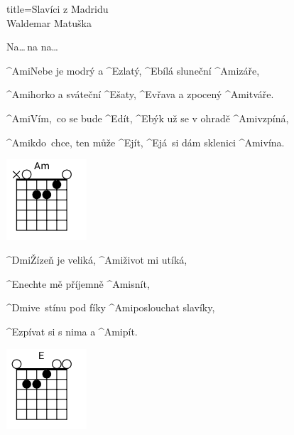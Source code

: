 \begin{song}{title=\predtitle\centering Slavíci z Madridu \\\large Waldemar Matuška \vspace*{-0.3cm}}  %
\begin{centerjustified}

	Na\elipsa\dots\,na na\elipsa\dots

\phantom{.}

\begin{minipage}{0.65\textwidth}
\sloka
	^{Ami\z}Nebe je modrý a ^{E\z}zlatý, ^{E\z}bílá sluneční ^{Ami\z}záře,\:\:

	^{Ami\z}horko a sváteční ^{E\z}šaty, ^{E\z}vřava a zpocený ^{Ami\z}tváře.

	^{Ami\z}Vím,~co se bude ^{E}dít, ^{E\z}býk už se v ohradě ^{Ami\z}vzpíná,

	^{Ami\z}kdo~chce, ten může ^{E\z}jít, ^{E\z}já~si dám sklenici ^{Ami\z}vína.
\end{minipage}
\begin{minipage}{0.1\textwidth}
\includegraphics[width=3cm]{../Akordy/am}
\end{minipage}

\phantom{.}

\begin{minipage}{0.65\textwidth}
	^{Dmi\z}Žízeň je veliká, ^{Ami\z}život mi utíká,

	^{E\z}nechte mě příjemně ^{Ami\z}snít,

	^{Dmi\z}ve~stínu pod fíky ^{Ami\z}poslouchat slavíky,

	^{E\z}zpívat si s nima a ^{Ami\z}pít.\:\:\:\:\:
\end{minipage}
\begin{minipage}{0.1\textwidth}
\includegraphics[width=3cm]{../Akordy/e}
\end{minipage}


\end{centerjustified}
\end{song}
